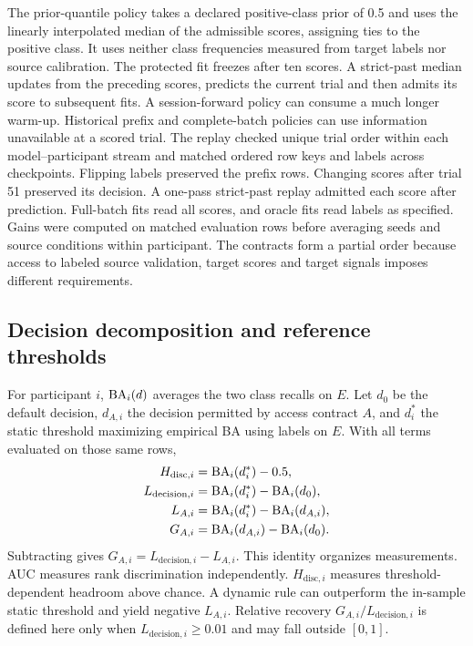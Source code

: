 The prior-quantile policy takes a declared positive-class prior of 0.5 and uses the linearly interpolated median of the admissible scores, assigning ties to the positive class. It uses neither class frequencies measured from target labels nor source calibration. The protected fit freezes after ten scores. A strict-past median updates from the preceding scores, predicts the current trial and then admits its score to subsequent fits. A session-forward policy can consume a much longer warm-up. Historical prefix and complete-batch policies can use information unavailable at a scored trial. The replay checked unique trial order within each model--participant stream and matched ordered row keys and labels across checkpoints. Flipping labels preserved the prefix rows. Changing scores after trial 51 preserved its decision. A one-pass strict-past replay admitted each score after prediction. Full-batch fits read all scores, and oracle fits read labels as specified. Gains were computed on matched evaluation rows before averaging seeds and source conditions within participant. The contracts form a partial order because access to labeled source validation, target scores and target signals imposes different requirements.

\subsection{Decision decomposition and reference thresholds}
For participant $i$, $\mathrm{BA}_i(d)$ averages the two class recalls on $E$. Let $d_0$ be the default decision, $d_{A,i}$ the decision permitted by access contract $A$, and $d_i^*$ the static threshold maximizing empirical BA using labels on $E$. With all terms evaluated on those same rows,
\begin{align}
H_{\mathrm{disc},i}&=\mathrm{BA}_i(d_i^*)-0.5,\\
L_{\mathrm{decision},i}&=\mathrm{BA}_i(d_i^*)-\mathrm{BA}_i(d_0),\\
L_{A,i}&=\mathrm{BA}_i(d_i^*)-\mathrm{BA}_i(d_{A,i}),\\
G_{A,i}&=\mathrm{BA}_i(d_{A,i})-\mathrm{BA}_i(d_0).
\end{align}
Subtracting gives $G_{A,i}=L_{\mathrm{decision},i}-L_{A,i}$. This identity organizes measurements. AUC measures rank discrimination independently. $H_{\mathrm{disc},i}$ measures threshold-dependent headroom above chance. A dynamic rule can outperform the in-sample static threshold and yield negative $L_{A,i}$. Relative recovery $G_{A,i}/L_{\mathrm{decision},i}$ is defined here only when $L_{\mathrm{decision},i}\geq0.01$ and may fall outside $[0,1]$.


